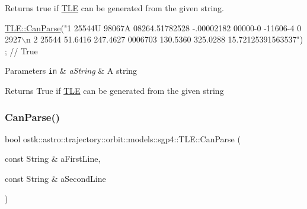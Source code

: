 Returns true if \hyperlink{classostk_1_1astro_1_1trajectory_1_1orbit_1_1models_1_1sgp4_1_1_t_l_e}{T\+LE} can be generated from the given string. 


\begin{DoxyCode}
\hyperlink{classostk_1_1astro_1_1trajectory_1_1orbit_1_1models_1_1sgp4_1_1_t_l_e_a843f3432e8411de6b8d7e9c40d7191d2}{TLE::CanParse}(\textcolor{stringliteral}{"1 25544U 98067A   08264.51782528 -.00002182  00000-0 -11606-4 0  2927\(\backslash\)n}
\textcolor{stringliteral}{               2 25544  51.6416 247.4627 0006703 130.5360 325.0288 15.72125391563537"}) ; \textcolor{comment}{// True}
\end{DoxyCode}



\begin{DoxyParams}[1]{Parameters}
\mbox{\tt in}  & {\em a\+String} & A string \\
\hline
\end{DoxyParams}
\begin{DoxyReturn}{Returns}
True if \hyperlink{classostk_1_1astro_1_1trajectory_1_1orbit_1_1models_1_1sgp4_1_1_t_l_e}{T\+LE} can be generated from the given string 
\end{DoxyReturn}
\mbox{\label{classostk_1_1astro_1_1trajectory_1_1orbit_1_1models_1_1sgp4_1_1_t_l_e_a1e808cef2bd2466a8d7813f2c5d5bfc4}} 
\subsubsection{\texorpdfstring{Can\+Parse()}{CanParse()}\hspace{0.1cm}{\footnotesize\ttfamily [2/2]}}
{\footnotesize\ttfamily bool ostk\+::astro\+::trajectory\+::orbit\+::models\+::sgp4\+::\+T\+L\+E\+::\+Can\+Parse (\begin{DoxyParamCaption}\item[{const String \&}]{a\+First\+Line,  }\item[{const String \&}]{a\+Second\+Line }\end{DoxyParamCaption})\hspace{0.3cm}{\ttfamily [static]}}




